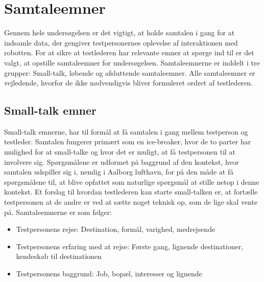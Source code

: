\section{Samtaleemner}
\label{ParametreSamtaleemner}
%
Gennem hele undersøgelsen er det vigtigt, at holde samtalen i gang for at indsamle data, der gengiver testpersonernes oplevelse af interaktionen med robotten. For at sikre at testlederen har relevante emner at spørge ind til er det valgt, at opstille samtaleemner for undersøgelsen. Samtaleemnerne er inddelt i tre grupper: Small-talk, løbende og afsluttende samtaleemner. Alle samtaleemner er vejledende, hvorfor de ikke nødvendigvis bliver formuleret ordret af testlederen.

\subsection{Small-talk emner} 
\label{ParametreISmallTalk}
%
Small-talk emnerne, har til formål at få samtalen i gang mellem testperson og testleder. Samtalen fungerer primært som en ice-breaker, hvor de to parter har mulighed for at small-talke og hvor det er muligt, at få testpersonen til at involvere sig. Spørgsmålene er udformet på baggrund af den kontekst, hvor samtalen udspiller sig i, nemlig i Aalborg lufthavn, for på den måde at få spørgsmålene til, at blive opfattet som naturlige spørgsmål at stille netop i denne kontekst. Et forslag til hvordan testlederen kan starte small-talken er, at fortælle testpersonen at de andre er ved at sætte noget teknisk op, som de lige skal vente på. Samtaleemnerne er som følger:\blankline
%
\begin{itemize}
\item Testpersonens rejse: Destination, formål, varighed, medrejsende
\item Testpersonens erfaring med at rejse: Første gang, lignende destinationer, kendeskab til destinationen 
\item Testpersonens baggrund: Job, bopæl, interesser og lignende
\end{itemize}
%
